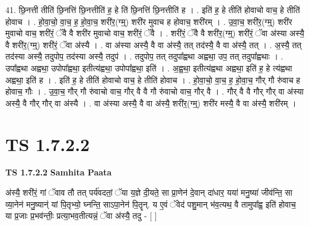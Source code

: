 \documentclass[17pt]{extarticle}
\begin{document}
41. छि॒नत्ती तीति॑ छि॒नत्ति॑ छि॒नत्तीति॑ ह॒ हे ति॑ छि॒नत्ति॑ छि॒नत्तीति॑ ह । . इति॑ ह॒ हे तीति॑ होवाचो वाच॒ हे तीति॑ होवाच । . हो॒वा॒चो॒ वा॒च॒ ह॒ हो॒वा॒च॒ शरी॑र॒(ग्म्॒) शरी॑र मुवाच ह होवाच॒ शरी॑रम् । . उ॒वा॒च॒ शरी॑र॒(ग्म्॒) शरी॑र मुवाचो वाच॒ शरी॑रं॒ ॅवै वै शरी॑र मुवाचो वाच॒ शरी॑रं॒ ॅवै । . शरी॑रं॒ ॅवै वै शरी॑र॒(ग्म्॒) शरी॑रं॒ ॅवा अ॑स्या अस्यै॒ वै शरी॑र॒(ग्म्॒) शरी॑रं॒ ॅवा अ॑स्यै । . वा अ॑स्या अस्यै॒ वै वा अ॑स्यै॒ तत् तद॑स्यै॒ वै वा अ॑स्यै॒ तत् । . अ॒स्यै॒ तत् तद॑स्या अस्यै॒ तदुपोप॒ तद॑स्या अस्यै॒ तदुप॑ । . तदुपोप॒ तत् तदुपा᳚ह्वथा अह्वथा॒ उप॒ तत् तदुपा᳚ह्वथाः । . उपा᳚ह्वथा अह्वथा॒ उपोपा᳚ह्वथा॒ इतीत्य॑ह्वथा॒ उपोपा᳚ह्वथा॒ इति॑ । . अ॒ह्व॒था॒ इतीत्य॑ह्वथा अह्वथा॒ इति॑ ह॒ हे त्य॑ह्वथा अह्वथा॒ इति॑ ह । . इति॑ ह॒ हे तीति॑ होवाचो वाच॒ हे तीति॑ होवाच । . हो॒वा॒चो॒ वा॒च॒ ह॒ हो॒वा॒च॒ गौर् गौ रु॑वाच ह होवाच॒ गौः । . उ॒वा॒च॒ गौर् गौ रु॑वाचो वाच॒ गौर् वै वै गौ रु॑वाचो वाच॒ गौर् वै । . गौर् वै वै गौर् गौर् वा अ॑स्या अस्यै॒ वै गौर् गौर् वा अ॑स्यै । . वा अ॑स्या अस्यै॒ वै वा अ॑स्यै॒ शरी॑र॒(ग्म्॒) शरी॑र मस्यै॒ वै वा अ॑स्यै॒ शरी॑रम् । \newline
\pagebreak
{}
\section*{ TS 1.7.2.2 }

\textbf{TS 1.7.2.2 } \newline
\textbf{Samhita Paata} \newline

अ॑स्यै॒ शरी॑रं॒ गां ॅवाव तौ तत् पर्य॑वदतां॒ ॅया य॒ज्ञे दी॒यते॒ सा प्रा॒णेन॑ दे॒वान् दा॑धार॒ यया॑ मनु॒ष्या॑ जीव॑न्ति॒ सा व्या॒नेन॑ मनु॒ष्यान्॑ यां पि॒तृभ्यो॒ घ्नन्ति॒ साऽपा॒नेन॑ पि॒तॄन्. य ए॒वं ॅवेद॑ पशु॒मान् भ॑व॒त्यथ॒ वै तामुपा᳚ह्व॒ इति॑ होवाच॒ या प्र॒जाः प्र॒भव॑न्तीः॒ प्रत्या॒भव॒तीत्यन्नं॒ ॅवा अ॑स्यै॒ तदु - [ ] \newline
\end{document}
